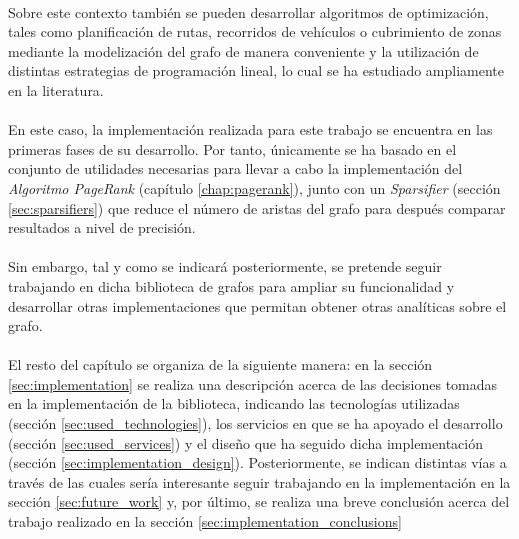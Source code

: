 \documentclass{subfiles}
\begin{document}
      \paragraph{}
      Sobre este contexto también se pueden desarrollar algoritmos de optimización, tales como planificación de rutas, recorridos de vehículos o cubrimiento de zonas mediante la modelización del grafo de manera conveniente y la utilización de distintas estrategias de programación lineal, lo cual se ha estudiado ampliamente en la literatura.

      \paragraph{}
      En este caso, la implementación realizada para este trabajo se encuentra en las primeras fases de su desarrollo. Por tanto, únicamente se ha basado en el conjunto de utilidades necesarias para llevar a cabo la implementación del \emph{Algoritmo PageRank} (capítulo \ref{chap:pagerank}), junto con un \emph{Sparsifier} (sección \ref{sec:sparsifiers}) que reduce el número de aristas del grafo para después comparar resultados a nivel de precisión.

      \paragraph{}
      Sin embargo, tal y como se indicará posteriormente, se pretende seguir trabajando en dicha biblioteca de grafos para ampliar su funcionalidad y desarrollar otras implementaciones que permitan obtener otras analíticas sobre el grafo.

      \paragraph{}
      El resto del capítulo se organiza de la siguiente manera: en la sección \ref{sec:implementation} se realiza una descripción acerca de las decisiones tomadas en la implementación de la biblioteca, indicando las tecnologías utilizadas (sección \ref{sec:used_technologies}), los servicios en que se ha apoyado el desarrollo (sección \ref{sec:used_services}) y el diseño que ha seguido dicha implementación (sección \ref{sec:implementation_design}). Posteriormente, se indican distintas vías a través de las cuales sería interesante seguir trabajando en la implementación en la sección \ref{sec:future_work} y, por último, se realiza una breve conclusión acerca del trabajo realizado en la sección \ref{sec:implementation_conclusions}
\end{document}

